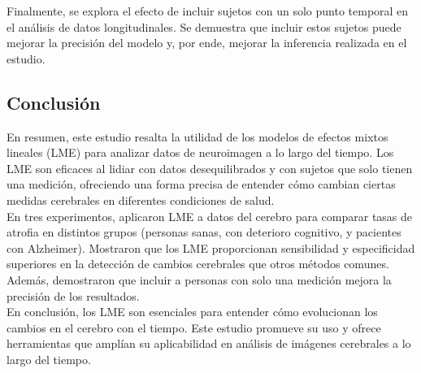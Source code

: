 \documentclass[12pt]{article}
\begin{document}
 Finalmente, se explora el efecto de incluir sujetos con un solo punto temporal en el análisis de datos longitudinales. Se demuestra que incluir estos sujetos puede mejorar la precisión del modelo y, por ende, mejorar la inferencia realizada en el estudio.


\subsection{Conclusión}
En resumen, este estudio resalta la utilidad de los modelos de efectos mixtos lineales (LME) para analizar datos de neuroimagen a lo largo del tiempo. Los LME son eficaces al lidiar con datos desequilibrados y con sujetos que solo tienen una medición, ofreciendo una forma precisa de entender cómo cambian ciertas medidas cerebrales en diferentes condiciones de salud.\\

En tres experimentos, aplicaron LME a datos del cerebro para comparar tasas de atrofia en distintos grupos (personas sanas, con deterioro cognitivo, y pacientes con Alzheimer). Mostraron que los LME proporcionan sensibilidad y especificidad superiores en la detección de cambios cerebrales que otros métodos comunes. Además, demostraron que incluir a personas con solo una medición mejora la precisión de los resultados.\\

En conclusión, los LME son esenciales para entender cómo evolucionan los cambios en el cerebro con el tiempo. Este estudio promueve su uso y ofrece herramientas que amplían su aplicabilidad en análisis de imágenes cerebrales a lo largo del tiempo.
\end{document}
